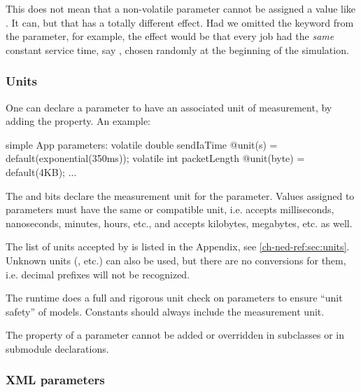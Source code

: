 \begin{note}
    This does not mean that a non-volatile parameter cannot be assigned a value
    like . It can, but that has a totally different
    effect. Had we omitted the  keyword from the
     parameter, for example, the effect would be that every
    job had the \textit{same} constant service time, say ,
    chosen randomly at the beginning of the simulation.
\end{note}

\subsubsection{Units}

One can declare a parameter to have an associated unit of measurement,
by adding the  property. An example:

\begin{ned}
simple App
{
    parameters:
        volatile double sendIaTime @unit(s) = default(exponential(350ms));
        volatile int packetLength @unit(byte) = default(4KB);
    ...
}
\end{ned}

The  and  bits declare the measurement unit
for the parameter. Values assigned to parameters must have the same or
compatible unit, i.e.  accepts milliseconds, nanoseconds,
minutes, hours, etc., and  accepts kilobytes, megabytes,
etc. as well.

\begin{note}
    The list of units accepted by {\opp} is listed in the Appendix, see
    \ref{ch-ned-ref:sec:units}. Unknown units (, etc.)
    can also be used, but there are no conversions for them,
    i.e. decimal prefixes will not be recognized.
\end{note}

The {\opp} runtime does a full and rigorous unit check on
parameters to ensure ``unit safety'' of models. Constants should
always include the measurement unit.

The  property of a parameter cannot be added or overridden
in subclasses or in submodule declarations.


\subsubsection{XML parameters}

